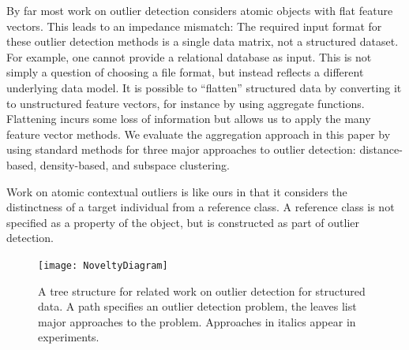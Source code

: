 \documentclass[conference]{IEEEtran}
\begin{document}
By far most work on outlier detection considers atomic objects with flat feature vectors.
This leads to an impedance mismatch: The required input format for these outlier detection methods is a single data matrix, not a structured dataset. For example, one cannot provide a relational database as input. This is not simply a question of choosing a file format, but instead reflects a different underlying data model.
%
It is possible to ``flatten'' structured data by converting it to unstructured feature vectors, for instance by using aggregate functions. Flattening incurs some loss of information but allows us to apply the many feature vector methods.
We evaluate the aggregation approach in this paper by using standard methods for three major approaches to outlier detection: distance-based, density-based, and subspace clustering. 


Work on atomic contextual  outliers \cite{Tang2013} is like ours in that it considers the distinctness of a target individual from a reference class. A reference class is not specified as a property of the object, but is constructed as part of outlier detection. 
\begin{figure}
	\centering
	\texttt{[image: NoveltyDiagram]}
	\caption{A tree structure for related work on outlier detection for structured data. A path specifies an outlier detection problem, the leaves list major approaches to the problem. Approaches in italics appear in experiments.
		\label{fig:novelty}}
\end{figure}
\end{document}
